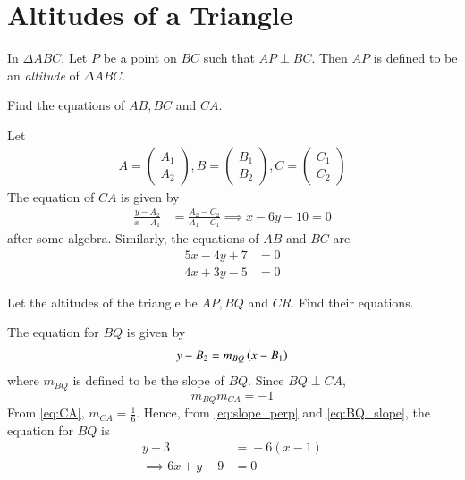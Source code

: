 \documentclass[journal,12pt,twocolumn]{IEEEtran}
\begin{document}
\section{Altitudes of a Triangle}
\begin{definition}
In $\Delta ABC$,  Let $P$ be a point on $BC$ such that $AP \perp BC$.  Then $AP$ is defined to be 
an {\em altitude} of $\Delta ABC$.
\end{definition}
\begin{problem}
Find the equations of $AB, BC$ and $CA$.
\end{problem}
\solution Let
\begin{align}
A = 
\begin{pmatrix}
A_1
\\
A_2
\end{pmatrix},
B = 
\begin{pmatrix}
B_1
\\
B_2
\end{pmatrix},
C = 
\begin{pmatrix}
C_1
\\
C_2
\end{pmatrix}
\end{align}
%
The equation of $CA$ is given by
%
\begin{align}
\frac{y - A_2}{x-A_1} &= \frac{A_2 \! - \! C_2}{A_1 \! - \! C_1} 
\implies x - 6y - 10 = 0
\label{eq:CA}
\end{align}
%
after some algebra. Similarly, the equations of $AB$ and $BC$ are
%
\begin{align}
5x -4y +7 &= 0
\\
4x + 3y -5 &= 0
\end{align}
\begin{problem}
Let the altitudes of the triangle be $AP,BQ$ and $CR$. Find their equations.
\end{problem}
\solution The equation for $BQ$ is given by
%
\begin{align}
\label{eq:BQ_slope}
y-B_2 = m_{BQ}\left(x-B_1\right)
\end{align}
%
where $m_{BQ}$ is defined to be the slope of $BQ$. Since $BQ\perp CA$,
\begin{equation}
\label{eq:slope_perp}
m_{BQ}m_{CA} = -1
\end{equation}
From \eqref{eq:CA}, $m_{CA} = \frac{1}{6}$. Hence, from \eqref{eq:slope_perp} and \eqref{eq:BQ_slope}, the equation for $BQ$ is
\begin{align}
y \! - \! 3 \! &= \! -6(x \! - \! 1)
\\
\implies 6x + y \! - 9 &= 0
\end{align}
\end{document}
